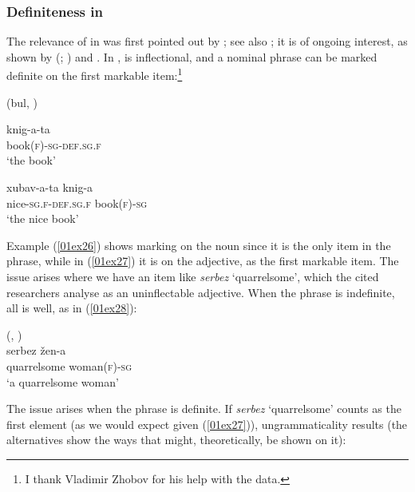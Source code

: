 \documentclass[output=paper,colorlinks,citecolor=brown]{langscibook}
\begin{document}
\subsubsection{Definiteness in }

The relevance of  in  was first pointed out by \citet[150--153]{halpern1995}; see also \citet[128--130]{spencerluis2012}; it is of ongoing interest, as shown by \citeauthor{adamson2019} (\citeyear[83--103]{adamson2019}; \citeyear{adamson2022}) and \citet{georgieva2023}. In ,  is inflectional, and a nominal phrase can be marked definite on the first markable item:\footnote{I thank Vladimir Zhobov for his help with the  data.}

\vspace*{0.3cm}

\noindent {} (bul, \citealt[128--130]{spencerluis2012})
\begin{exe}
	\ex  \label{01ex26}
	\gll knig-a-ta \\
	book\textsc{(f)-sg-def.sg.f} \\
	\trans ‘the book’
	
	\ex  \label{01ex27}
	\gll xubav-a-ta		knig-a \\
	nice-\textsc{sg.f-def.sg.f}	book\textsc{(f)-sg}  \\
	\trans ‘the nice book’
\end{exe}

Example (\ref{01ex26}) shows  marking on the noun since it is the only item in the phrase, while in (\ref{01ex27}) it is on the adjective, as the first markable item. The issue arises where we have an item like \textit{serbez} `quarrelsome', which the cited researchers analyse as an uninflectable adjective. When the phrase is indefinite, all is well, as in (\ref{01ex28}):

\begin{exe}
	\ex {} (\citealt[150--153]{halpern1995}, \citealt[128--130]{spencerluis2012}) \label{01ex28} \\
	\gll serbez		žen-a \\
	quarrelsome	woman\textsc{(f)-sg} \\
	\trans ‘a quarrelsome woman’
\end{exe}

The issue arises when the phrase is definite. If \textit{serbez} `quarrelsome' counts as the first element (as we would expect given (\ref{01ex27})), ungrammaticality results (the alternatives show the ways that  might, theoretically, be shown on it):
\end{document}
